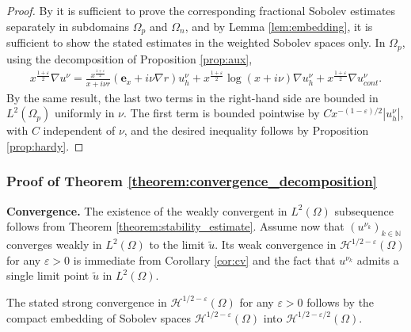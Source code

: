 \documentclass[report]{elsarticle}
\numberwithin{theorem}{section}
\renewcommand{\vec}[1]{\mathbf{#1}}
\newcommand{\re}{\varepsilon}
\begin{document}
\begin{proof}
	By \cite[Theorem 2.4]{jakovlev} it is sufficient to prove the corresponding fractional Sobolev estimates separately in subdomains $\Omega_p$ and $\Omega_n$, and by Lemma \ref{lem:embedding}, it is sufficient to show the stated estimates in the weighted Sobolev spaces only. In $\Omega_p$, using the decomposition of Proposition \ref{prop:aux},
	\begin{align*}
		x^{\frac{1+\re}{2}}\nabla u^{\nu}=\frac{x^{\frac{1+\re}{2}}}{x+i\nu r}(\vec{e}_x+i\nu\nabla r)u^{\nu}_h+	x^{\frac{1+\re}{2}}\log(x+i\nu)\nabla u^{\nu}_h+x^{\frac{1+\re}{2}}\nabla u^{\nu}_{cont}.
	\end{align*}
	By the same result, the last two terms in the right-hand side are bounded  in $L^2(\Omega_p)$ uniformly in $\nu$. The first term is bounded pointwise by $Cx^{-(1-\re)/2}|u^{\nu}_h|$, with $C$ independent of $\nu$,  
	and the desired inequality follows by Proposition \ref{prop:hardy}. 
\end{proof}
\subsubsection{Proof of Theorem \ref{theorem:convergence_decomposition}}
\textbf{Convergence. }The existence of the weakly convergent in $L^2(\Omega)$ subsequence follows from Theorem \ref{theorem:stability_estimate}. Assume now that $(u^{\nu_k})_{k\in \mathbb{N}}$ converges weakly in $L^2(\Omega)$ to the limit $\widetilde{u}$. Its weak convergence in $\mathcal{H}^{1/2-\re}(\Omega)$ for any $\re>0$ is immediate from Corollary \ref{cor:cv} and the fact that $u^{\nu_k}$ admits a single limit point $\widetilde{u}$ in $L^2(\Omega)$.

The stated strong convergence in $\mathcal{H}^{1/2-\re}(\Omega)$ for any $\re>0$ follows by the compact embedding of Sobolev spaces $\mathcal{H}^{1/2-\re}(\Omega)$ into $\mathcal{H}^{1/2-\re/2}(\Omega)$.  
\end{document}
